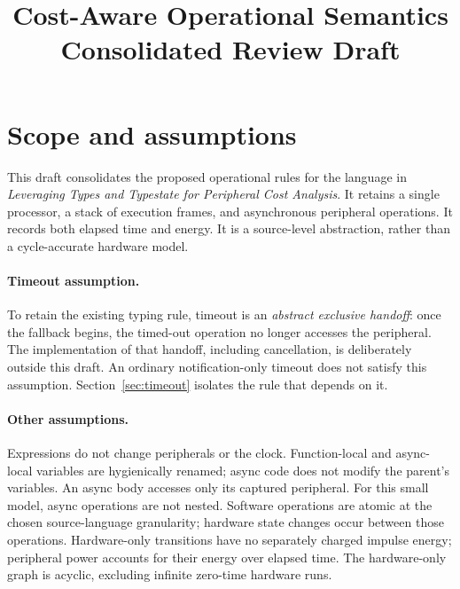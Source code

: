\documentclass[11pt]{article}
\title{Cost-Aware Operational Semantics\\\large Consolidated Review Draft}
\author{}
\date{}
\begin{document}
\maketitle
\vspace{-2em}

\section{Scope and assumptions}
This draft consolidates the proposed operational rules for the language in
\emph{Leveraging Types and Typestate for Peripheral Cost Analysis}.
It retains a single processor, a stack of execution frames, and asynchronous
peripheral operations. It records both elapsed time and energy. It is a
source-level abstraction, rather than a cycle-accurate hardware model.

\paragraph{Timeout assumption.}
To retain the existing typing rule, timeout is an \emph{abstract exclusive
handoff}: once the fallback begins, the timed-out operation no longer accesses
the peripheral. The implementation of that handoff, including cancellation,
is deliberately outside this draft. An ordinary notification-only timeout
does not satisfy this assumption. Section~\ref{sec:timeout} isolates the rule
that depends on it.

\paragraph{Other assumptions.}
Expressions do not change peripherals or the clock. Function-local and
async-local variables are hygienically renamed; async code does not modify
the parent's variables. An async body accesses only its captured peripheral.
For this small model, async operations are not nested. Software operations are
atomic at the chosen source-language granularity; hardware state changes occur
between those operations. Hardware-only transitions have no separately charged
impulse energy; peripheral power accounts for their energy over elapsed time.
The hardware-only graph is acyclic, excluding infinite zero-time hardware runs.
\end{document}

